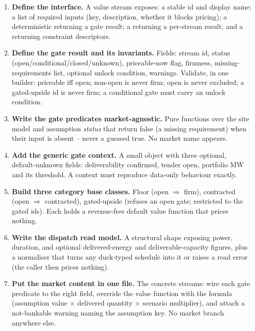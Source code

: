 \begin{rebuild}
\begin{enumerate}
  \item \textbf{Define the interface.} A value stream exposes: a stable id and display name; a list of required inputs (key, description, whether it blocks pricing); a deterministic  returning a gate result; a  returning a per-stream result; and a  returning constraint descriptors.
  \item \textbf{Define the gate result and its invariants.} Fields: stream id, status (open/conditional/closed/unknown), priceable-now flag, firmness, missing-requirements list, optional unlock condition, warnings. Validate, in one builder: priceable iff open; non-open is never firm; open is never excluded; a gated-upside id is never firm; a conditional gate must carry an unlock condition.
  \item \textbf{Write the gate predicates market-agnostic.} Pure functions over the site model and assumption \emph{status} that return false (a missing requirement) when their input is absent -- never a guessed true. No market name appears.
  \item \textbf{Add the generic gate context.} A small object with three optional, default-unknown fields: deliverability confirmed, tender open, portfolio MW and its threshold. A  context must reproduce data-only behaviour exactly.
  \item \textbf{Build three category base classes.} Floor (open $\Rightarrow$ firm), contracted (open $\Rightarrow$ contracted), gated-upside (refuses an open gate; restricted to the gated ids). Each holds a revenue-free default value function that prices nothing.
  \item \textbf{Write the dispatch read model.} A structural shape exposing power, duration, and optional delivered-energy and deliverable-capacity figures, plus a normaliser that turns any duck-typed schedule into it or raises a read error (the caller then prices nothing).
  \item \textbf{Put the market content in one file.} The concrete streams: wire each gate predicate to the right field, override the value function with the formula (assumption value $\times$ delivered quantity $\times$ scenario multiplier), and attach a not-bankable warning naming the assumption key. No market branch anywhere else.

\end{enumerate}
\end{rebuild}
